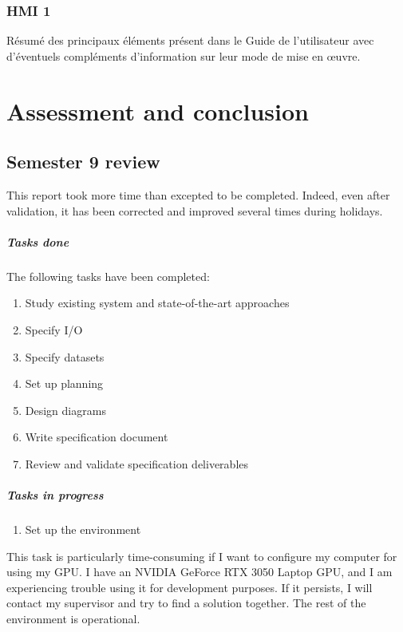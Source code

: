 \documentclass{polytech/polytech}
\numberwithin{figure}{chapter}
\begin{document}
\subsection{HMI 1}

Résumé des principaux éléments présent dans le Guide de l'utilisateur
avec d'éventuels compléments d'information sur leur mode de mise en œuvre.


\chapter{Assessment and conclusion}

\section{Semester 9 review}

This report took more time than excepted to be completed.
Indeed, even after validation, it has been corrected and improved several times during holidays.

\paragraph{Tasks done}

The following tasks have been completed:
\begin{enumerate}
\item Study existing system and state-of-the-art approaches
\item Specify I/O
\item Specify datasets
\item Set up planning
\item Design diagrams
\item Write specification document
\item Review and validate specification deliverables
\end{enumerate}

\paragraph{Tasks in progress}

\begin{enumerate}
\item Set up the environment
\end{enumerate}

This task is particularly time-consuming if I want to configure my computer for using my GPU.
I have an NVIDIA GeForce RTX 3050 Laptop GPU, and I am experiencing trouble using it for development purposes.
If it persists, I will contact my supervisor and try to find a solution together.
The rest of the environment is operational.
\end{document}
